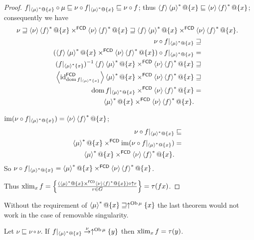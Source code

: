 \begin{proof}
$f|_{\rsupfun{\mu}@\{x\}}\circ\mu\sqsubseteq\nu\circ f|_{\rsupfun{\mu}@\{x\}}\sqsubseteq\nu\circ f$;
thus $\langle f\rangle\rsupfun{\mu}@\{x\}\sqsubseteq\supfun{\nu}\rsupfun{f}@\{x\}$;
consequently we have
\begin{gather*}
\nu\sqsupseteq\supfun{\nu}\rsupfun{f}@\{x\}\times^{\mathsf{FCD}}\supfun{\nu}\rsupfun{f}@\{x\}\sqsupseteq\supfun f\rsupfun{\mu}@\{x\}\times^{\mathsf{FCD}}\supfun{\nu}\rsupfun{f}@\{x\}.\\
\begin{aligned}\nu\circ f|_{\rsupfun{\mu}@\{x\}} & \sqsupseteq\\
(\supfun f\rsupfun{\mu}@\{x\}\times^{\mathsf{FCD}}\supfun{\nu}\rsupfun{f}@\{x\})\circ f|_{\rsupfun{\mu}@\{x\}} & =\\
(f|_{\rsupfun{\mu}\{x\}})^{-1}\supfun f\rsupfun{\mu}@\{x\}\times^{\mathsf{FCD}}\supfun{\nu}\rsupfun{f}@\{x\} & \sqsupseteq\\
\supfun{\id_{\dom f|_{\rsupfun{\mu}\{x\}}}^{\mathsf{FCD}}}\rsupfun{\mu}@\{x\}\times^{\mathsf{FCD}}\supfun{\nu}\rsupfun{f}@\{x\} & \sqsupseteq\\
\dom f|_{\rsupfun{\mu}@\{x\}}\times^{\mathsf{FCD}}\supfun{\nu}\rsupfun{f}@\{x\} & =\\
\rsupfun{\mu}@\{x\}\times^{\mathsf{FCD}}\supfun{\nu}\rsupfun{f}@\{x\}.
\end{aligned}
\end{gather*}


$\im(\nu\circ f|_{\rsupfun{\mu}@\{x\}})=\supfun{\nu}\rsupfun{f}@\{x\}$;
\begin{align*}
\nu\circ f|_{\rsupfun{\mu}@\{x\}} & \sqsubseteq\\
\rsupfun{\mu}@\{x\}\times^{\mathsf{FCD}}\im(\nu\circ f|_{\rsupfun{\mu}@\{x\}}) & =\\
\rsupfun{\mu}@\{x\}\times^{\mathsf{FCD}}\supfun{\nu}\rsupfun{f}@\{x\}.
\end{align*}
So $\nu\circ f|_{\rsupfun{\mu}@\{x\}}=\rsupfun{\mu}@\{x\}\times^{\mathsf{FCD}}\supfun{\nu}\rsupfun{f}@\{x\}$.

Thus $\xlim_{x}f=\setcond{(\rsupfun{\mu}@\{x\}\times^{\mathsf{FCD}}\supfun{\nu}\rsupfun{f}@\{x\})\circ\uparrow r}{r\in G}=\tau(fx)$.\end{proof}
\begin{rem}
Without the requirement of $\rsupfun{\mu}@\{x\}\sqsupseteq\uparrow^{\Ob\mu}\{x\}$
the last theorem would not work in the case of removable singularity.\end{rem}
\begin{thm}
Let $\nu\sqsubseteq\nu\circ\nu$. If $f|_{\rsupfun{\mu}@\{x\}}\overset{\nu}{\rightarrow}\uparrow^{\Ob\mu}\{y\}$
then $\xlim_{x}f=\tau(y)$.\end{thm}
